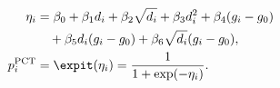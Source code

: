 \begin{align}
\eta_i
 &= \beta_0 + \beta_1 d_i + \beta_2 \sqrt{d_i}
  + \beta_3 d_i^2 + \beta_4 (g_i-g_0) \notag\\
 &\quad + \beta_5 d_i(g_i-g_0)
  + \beta_6 \sqrt{d_i}(g_i-g_0),
\label{eq:pct-predictor}\\
p_i^{\mathrm{PCT}}
 &= \expit(\eta_i)
  = \frac{1}{1+\exp(-\eta_i)}.
\label{eq:pct-probability}
\end{align}

